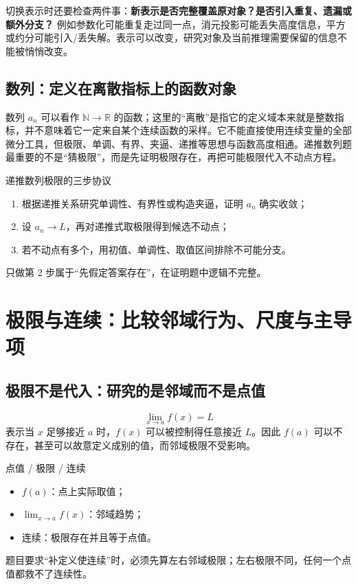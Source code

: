 \documentclass[11pt,a4paper,openany]{ctexbook}
\newcommand{\key}[1]{\textbf{\color{deep}#1}}
\begin{document}
切换表示时还要检查两件事：\key{新表示是否完整覆盖原对象？是否引入重复、遗漏或额外分支？} 例如参数化可能重复走过同一点，消元投影可能丢失高度信息，平方或约分可能引入/丢失解。表示可以改变，研究对象及当前推理需要保留的信息不能被悄悄改变。

\section{数列：定义在离散指标上的函数对象}
数列 $a_n$ 可以看作 $\mathbb N\to\mathbb R$ 的函数；这里的“离散”是指它的定义域本来就是整数指标，并不意味着它一定来自某个连续函数的采样。它不能直接使用连续变量的全部微分工具，但极限、单调、有界、夹逼、递推等思想与函数高度相通。递推数列题最重要的不是“猜极限”，而是先证明极限存在，再把可能极限代入不动点方程。

\begin{examBox}{递推数列极限的三步协议}
\begin{enumerate}
  \item 根据递推关系研究单调性、有界性或构造夹逼，证明 $a_n$ 确实收敛；
  \item 设 $a_n\to L$，再对递推式取极限得到候选不动点；
  \item 若不动点有多个，用初值、单调性、取值区间排除不可能分支。
\end{enumerate}
只做第 2 步属于“先假定答案存在”，在证明题中逻辑不完整。
\end{examBox}

\chapter{极限与连续：比较邻域行为、尺度与主导项}

\section{极限不是代入：研究的是邻域而不是点值}
\[
\lim_{x\to a}f(x)=L
\]
表示当 $x$ 足够接近 $a$ 时，$f(x)$ 可以被控制得任意接近 $L$。因此 $f(a)$ 可以不存在，甚至可以故意定义成别的值，而邻域极限不受影响。

\begin{boundarybox}{点值 / 极限 / 连续}
\begin{itemize}
  \item $f(a)$：点上实际取值；
  \item $\lim_{x\to a}f(x)$：邻域趋势；
  \item 连续：极限存在并且等于点值。
\end{itemize}
题目要求“补定义使连续”时，必须先算左右邻域极限；左右极限不同，任何一个点值都救不了连续性。
\end{boundarybox}
\end{document}
